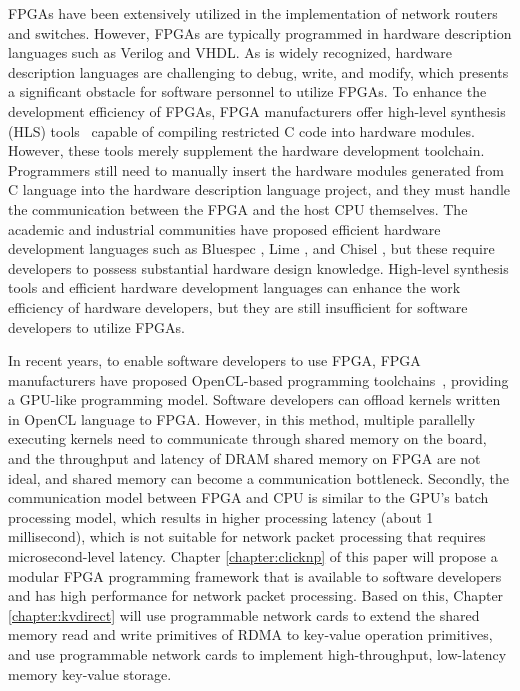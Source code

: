 FPGAs have been extensively utilized in the implementation of network routers and switches. However, FPGAs are typically programmed in hardware description languages such as Verilog and VHDL. As is widely recognized, hardware description languages are challenging to debug, write, and modify, which presents a significant obstacle for software personnel to utilize FPGAs. To enhance the development efficiency of FPGAs, FPGA manufacturers offer high-level synthesis (HLS) tools~\cite{vivado,intel-hls} capable of compiling restricted C code into hardware modules. However, these tools merely supplement the hardware development toolchain. Programmers still need to manually insert the hardware modules generated from C language into the hardware description language project, and they must handle the communication between the FPGA and the host CPU themselves. The academic and industrial communities have proposed efficient hardware development languages such as Bluespec \cite{bluespec}, Lime \cite{auerbach2010lime}, and Chisel \cite{bachrach2012chisel} \cite{bacon2013fpga,singh2011implementing,wester2015transformation}, but these require developers to possess substantial hardware design knowledge. High-level synthesis tools and efficient hardware development languages can enhance the work efficiency of hardware developers, but they are still insufficient for software developers to utilize FPGAs.

In recent years, to enable software developers to use FPGA, FPGA manufacturers have proposed OpenCL-based programming toolchains~\cite{aoc,sdaccel}, providing a GPU-like programming model. Software developers can offload kernels written in OpenCL language to FPGA. However, in this method, multiple parallelly executing kernels need to communicate through shared memory on the board, and the throughput and latency of DRAM shared memory on FPGA are not ideal, and shared memory can become a communication bottleneck. Secondly, the communication model between FPGA and CPU is similar to the GPU's batch processing model, which results in higher processing latency (about 1 millisecond), which is not suitable for network packet processing that requires microsecond-level latency.
Chapter \ref{chapter:clicknp} of this paper will propose a modular FPGA programming framework that is available to software developers and has high performance for network packet processing.
Based on this, Chapter \ref{chapter:kvdirect} will use programmable network cards to extend the shared memory read and write primitives of RDMA to key-value operation primitives, and use programmable network cards to implement high-throughput, low-latency memory key-value storage.

